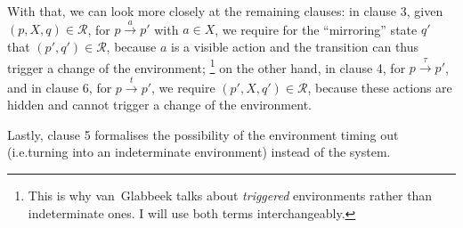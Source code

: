 \begin{isabellebody}
\begin{isamarkuptext}
With that, we can look more closely at the remaining clauses:
in clause 3, given $(p,X,q) \in \mathcal{R}$, for $p \xrightarrow{a} p'$ with $a \in X$, we require for the \enquote{mirroring} state $q'$ that $(p',q') \in \mathcal{R}$, because $a$ is a visible action and the transition can thus trigger a change of the environment;%
\footnote{This is why van~Glabbeek talks about \emph{triggered} environments rather than indeterminate ones. I will use both terms interchangeably.}
on the other hand, in clause 4, for $p \xrightarrow{\tau} p'$, and in clause 6, for $p \xrightarrow{t} p'$, we require $(p',X,q') \in \mathcal{R}$, because these actions are hidden and cannot trigger a change of the environment.

Lastly, clause 5 formalises the possibility of the environment timing out (i.e.\@ turning into an indeterminate environment) instead of the system.


\end{isamarkuptext}
\end{isabellebody}

